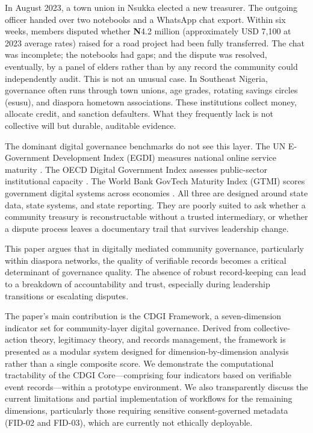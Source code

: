\documentclass[sigconf]{acmart}
\begin{document}
In August 2023, a town union in Nsukka elected a new treasurer. The outgoing officer handed over two notebooks and a WhatsApp chat export. Within six weeks, members disputed whether \textbf{N}4.2 million (approximately USD 7,100 at 2023 average rates) raised for a road project had been fully transferred. The chat was incomplete; the notebooks had gaps; and the dispute was resolved, eventually, by a panel of elders rather than by any record the community could independently audit. This is not an unusual case. In Southeast Nigeria, governance often runs through town unions, age grades, rotating savings circles (esusu), and diaspora hometown associations. These institutions collect money, allocate credit, and sanction defaulters. What they frequently lack is not collective will but durable, auditable evidence.

The dominant digital governance benchmarks do not see this layer. The UN E-Government Development Index (EGDI) measures national online service maturity \cite{un2022}. The OECD Digital Government Index assesses public-sector institutional capacity \cite{oecd2020}. The World Bank GovTech Maturity Index (GTMI) scores government digital systems across economies \cite{wb2021}. All three are designed around state data, state systems, and state reporting. They are poorly suited to ask whether a community treasury is reconstructable without a trusted intermediary, or whether a dispute process leaves a documentary trail that survives leadership change.

This paper argues that in digitally mediated community governance, particularly within diaspora networks, the quality of verifiable records becomes a critical determinant of governance quality. The absence of robust record-keeping can lead to a breakdown of accountability and trust, especially during leadership transitions or escalating disputes.

The paper’s main contribution is the CDGI Framework, a seven-dimension indicator set for community-layer digital governance. Derived from collective-action theory, legitimacy theory, and records management, the framework is presented as a modular system designed for dimension-by-dimension analysis rather than a single composite score. We demonstrate the computational tractability of the CDGI Core—comprising four indicators based on verifiable event records—within a prototype environment. We also transparently discuss the current limitations and partial implementation of workflows for the remaining dimensions, particularly those requiring sensitive consent-governed metadata (FID-02 and FID-03), which are currently not ethically deployable.
\end{document}
